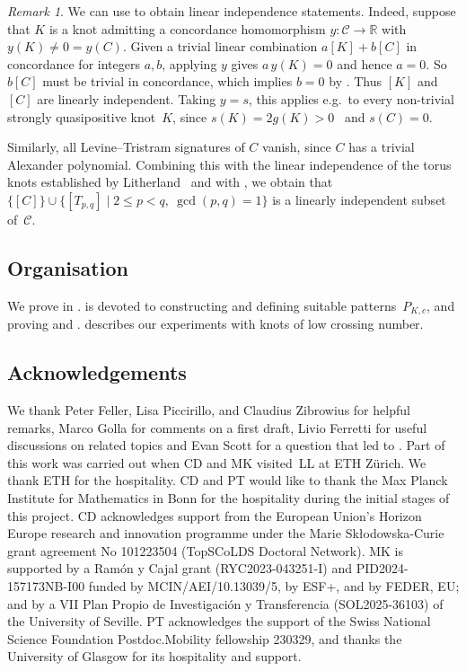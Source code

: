 \documentclass{amsart}
\theoremstyle{remark}
\newtheorem{remark}[theorem]{Remark}
\begin{document}
\begin{remark}\label{rmk:independent}
  We can use  to obtain linear independence statements. Indeed, suppose that $K$ is a knot admitting a concordance homomorphism $y\colon\mathcal{C}\to\mathbb{R}$ with~$y(K)\neq 0=y(C)$. Given a trivial linear combination $a[K]+b[C]$ in concordance for integers $a,b$, applying $y$ gives $a\,y(K)=0$ and hence $a=0$. So $b[C]$ must be trivial in concordance, which implies $b=0$ by . Thus $[K]$ and~$[C]$ are linearly independent. Taking $y=s$, this applies e.g.~to every non-trivial strongly quasipositive knot~$K$, since $s(K)=2g(K)>0$~\cite{zbMATH05274876} and $s(C)=0$.

  Similarly, all Levine--Tristram signatures of $C$ vanish, since $C$ has a trivial Alexander polynomial. Combining this with the linear independence of the torus knots established by Litherland~\cite{litherland} and with   , we obtain that $\{[C]\}\cup \{[T_{p,q}] \mid 2 \le p < q,\ \gcd(p,q)=1\}$ 
  is a linearly independent subset of~$\mathcal{C}$.
\end{remark}

\subsection*{Organisation}
We prove  in .  is devoted to constructing and defining suitable patterns~$P_{K,c}$, and proving  and . 
 describes our experiments with knots of low crossing number.

\subsection*{Acknowledgements}
We thank Peter Feller, Lisa Piccirillo, and Claudius Zibrowius for helpful remarks, Marco Golla for comments on a first draft, 
Livio Ferretti for useful discussions on related topics and Evan Scott for a question that led to .
Part of this work was carried out when CD and MK visited~LL at ETH Zürich. We thank ETH for the hospitality. CD and PT would like to thank the Max Planck Institute for Mathematics in Bonn for the hospitality during the initial stages of this project.
CD acknowledges support from the European Union's Horizon Europe research and innovation programme under the Marie Skłodowska-Curie grant agreement No 101223504 (TopSCoLDS Doctoral Network).
MK is supported by a Ram\'on y Cajal grant \mbox{(RYC2023-043251-I)} and PID2024-157173NB-I00 funded by MCIN/AEI/10.13039/5, by ESF+, and by FEDER, EU; and by a VII Plan Propio de Investigación y Transferencia (SOL2025-36103) of the University of Seville. 
PT acknowledges the support of the Swiss National Science Foundation Postdoc.Mobility fellowship 230329, and thanks the University of Glasgow for its hospitality and support.
\end{document}
